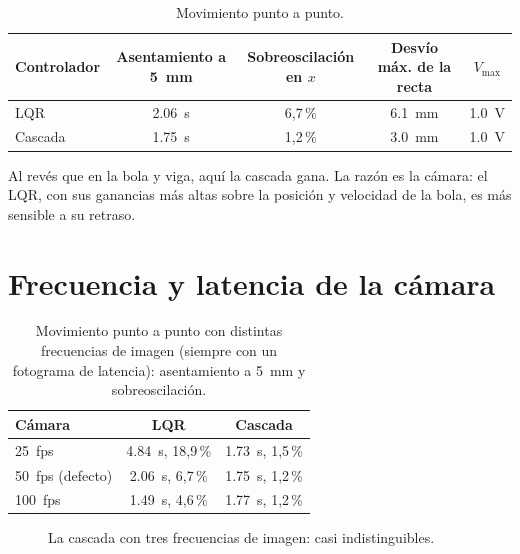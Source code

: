 \begin{table}[H]
\centering\small
\begin{tabular}{@{}lcccc@{}}
\toprule
Controlador & Asentamiento a \SI{5}{mm} & Sobreoscilación en $x$ & Desvío máx. de la recta & $V_{\max}$\\
\midrule
LQR & \SI{2.06}{s} & 6,7\,\% & \SI{6.1}{mm} & \SI{1.0}{V}\\
Cascada & \SI{1.75}{s} & 1,2\,\% & \SI{3.0}{mm} & \SI{1.0}{V}\\
\bottomrule
\end{tabular}
\caption{Movimiento punto a punto.}
\end{table}

Al revés que en la bola y viga, aquí la cascada gana. La razón es la cámara: el LQR, con sus ganancias más altas sobre la posición y velocidad de la bola, es más sensible a su retraso.

\section{Frecuencia y latencia de la cámara}
\label{sec:fps}

\begin{table}[H]
\centering\small
\begin{tabular}{@{}lcc@{}}
\toprule
Cámara & LQR & Cascada\\
\midrule
\SI{25}{fps} & \SI{4.84}{s}, 18,9\,\% & \SI{1.73}{s}, 1,5\,\%\\
\SI{50}{fps} (defecto) & \SI{2.06}{s}, 6,7\,\% & \SI{1.75}{s}, 1,2\,\%\\
\SI{100}{fps} & \SI{1.49}{s}, 4,6\,\% & \SI{1.77}{s}, 1,2\,\%\\
\bottomrule
\end{tabular}
\caption{Movimiento punto a punto con distintas frecuencias de imagen (siempre con un fotograma de latencia): asentamiento a \SI{5}{mm} y sobreoscilación.}
\label{tab:fps}
\end{table}

\begin{figure}[H]
\centering
{}
\caption{La cascada con tres frecuencias de imagen: casi indistinguibles.}
\label{fig:fps}
\end{figure}

